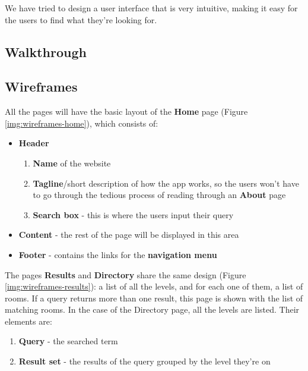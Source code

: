 \documentclass{sig-alt-release2}
\begin{document}
We have tried to design a user interface that is very intuitive, making it
easy for the users to find what they're looking for.

\subsection*{Walkthrough}

\subsection*{Wireframes}
All the pages will have the basic layout of the \textbf{Home} page
(Figure \ref{img:wireframes-home}), which consists of:
\begin{itemize} \itemsep1pt \parskip0pt 
	\item{
		\textbf{Header}
		\begin{enumerate} \itemsep1pt \parskip0pt 
			\item{
				\textbf{Name} of the website
			}
			\item{
				\textbf{Tagline}/short description of how the app works, so
				the users won't have to go through the tedious process of
				reading through an \textbf{About} page
			}
			\item{
				\textbf{Search box} - this is where the users input their
				query
			}
		\end{enumerate}
	}

	\item{
		\textbf{Content} - the rest of the page will be displayed in this area
	}
	
	\item{\textbf{Footer} - contains the links for the \textbf{navigation menu}
	}
\end{itemize}


The pages \textbf{Results} and \textbf{Directory} share the same design (Figure 
\ref{img:wireframes-results}): a list of all the levels, and for each one of 
them, a list of rooms. If a query returns more than one result, this page is 
shown with the list of matching rooms. In the case of the Directory page, all 
the levels are listed. Their elements are:
\begin{enumerate} \itemsep1pt \parskip0pt 
	\item{\textbf{Query} - the searched term}
	\item{\textbf{Result set} - the results of the query grouped by the level
	they're on}
\end{enumerate}
\end{document}
